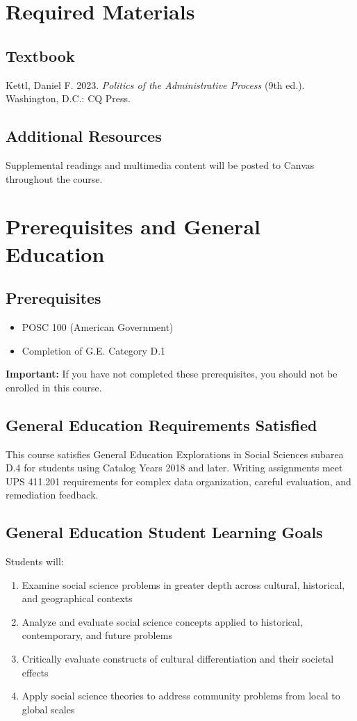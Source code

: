 \documentclass[11pt]{scrartcl} %
\begin{document}
\section{Required Materials}

\subsection{Textbook}
Kettl, Daniel F. 2023. \emph{Politics of the Administrative Process} (9th ed.). Washington, D.C.: CQ Press.

\subsection{Additional Resources}
Supplemental readings and multimedia content will be posted to Canvas throughout the course.

\section{Prerequisites and General Education}

\subsection{Prerequisites}
\begin{itemize}
\item POSC 100 (American Government)
\item Completion of G.E. Category D.1
\end{itemize}

\textbf{Important:} If you have not completed these prerequisites, you should not be enrolled in this course.

\subsection{General Education Requirements Satisfied}
This course satisfies General Education Explorations in Social Sciences subarea D.4 for students using Catalog Years 2018 and later. Writing assignments meet UPS 411.201 requirements for complex data organization, careful evaluation, and remediation feedback.

\subsection{General Education Student Learning Goals}
Students will:
\begin{enumerate}
\item Examine social science problems in greater depth across cultural, historical, and geographical contexts
\item Analyze and evaluate social science concepts applied to historical, contemporary, and future problems
\item Critically evaluate constructs of cultural differentiation and their societal effects
\item Apply social science theories to address community problems from local to global scales
\end{enumerate}
\end{document}
